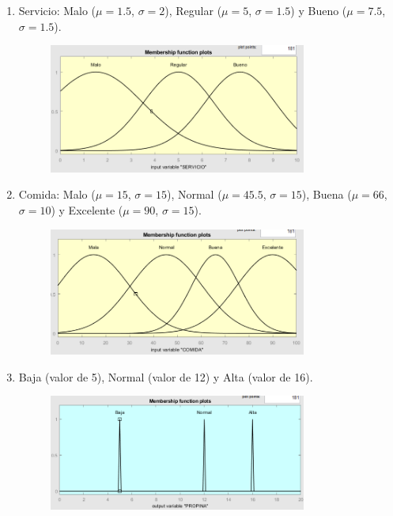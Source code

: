 \documentclass[11pt, letterpaper]{article}
\begin{document}
\begin{enumerate}
	\item Servicio: Malo ($\mu = 1.5$, $\sigma = 2$), Regular ($\mu = 5$, $\sigma = 1.5$) y Bueno ($\mu = 7.5$, $\sigma = 1.5$).
	\begin{figure}[h]
		\centering
		\includegraphics[width=0.8\textwidth]{IMG/P11.png}
	\end{figure}
	
	\newpage
	
	\item Comida: Malo ($\mu = 15$, $\sigma = 15$), Normal ($\mu = 45.5$, $\sigma = 15$), Buena ($\mu = 66$, $\sigma = 10$) y Excelente ($\mu = 90$, $\sigma = 15$).
	\begin{figure}[h]
		\centering
		\includegraphics[width=0.8\textwidth]{IMG/P12.png}
	\end{figure}
	
	\item Baja (valor de 5), Normal (valor de 12) y Alta (valor de 16).
	\begin{figure}[h]
		\centering
		\includegraphics[width=0.8\textwidth]{IMG/P13.png}
	\end{figure}
\end{enumerate}
\end{document}
